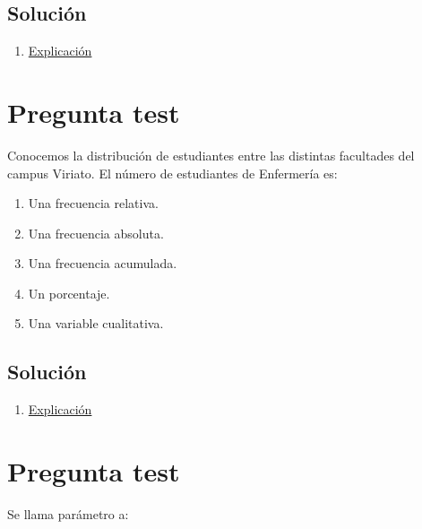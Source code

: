 \documentclass[
]{book}
\providecommand{\tightlist}{%
  \setlength{\itemsep}{0pt}\setlength{\parskip}{0pt}}
\begin{document}
\hypertarget{soluciuxf3n-11}{%
\subsection{Solución}\label{soluciuxf3n-11}}

\begin{enumerate}
\def\labelenumi{\alph{enumi})}
\setcounter{enumi}{2}
\tightlist
\item
  \href{https://1fjmanzano.github.io/bioestadistica/tablas-de-frecuencias.html}{Explicación}
\end{enumerate}

\hypertarget{pregunta-test-10}{%
\section{Pregunta test}\label{pregunta-test-10}}

Conocemos la distribución de estudiantes entre las distintas facultades del campus Viriato. El número de estudiantes de Enfermería es:

\begin{enumerate}
\def\labelenumi{\alph{enumi})}
\tightlist
\item
  Una frecuencia relativa.
\item
  Una frecuencia absoluta.
\item
  Una frecuencia acumulada.
\item
  Un porcentaje.
\item
  Una variable cualitativa.
\end{enumerate}

\hypertarget{soluciuxf3n-12}{%
\subsection{Solución}\label{soluciuxf3n-12}}

\begin{enumerate}
\def\labelenumi{\alph{enumi})}
\setcounter{enumi}{1}
\tightlist
\item
  \href{https://1fjmanzano.github.io/bioestadistica/tablas-de-frecuencias.html}{Explicación}
\end{enumerate}

\hypertarget{pregunta-test-11}{%
\section{Pregunta test}\label{pregunta-test-11}}

Se llama parámetro a:
\end{document}
